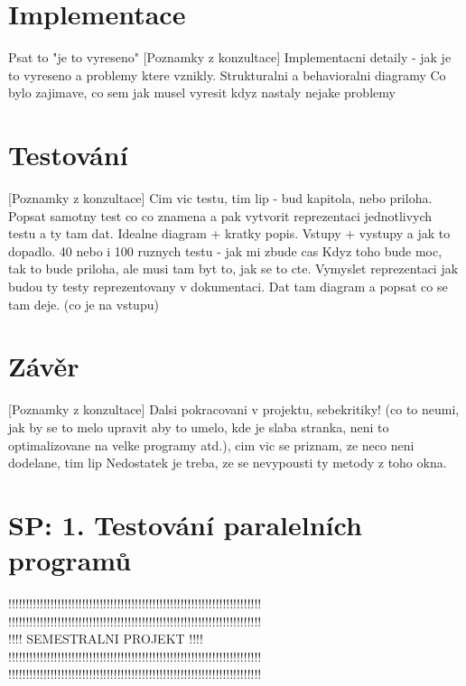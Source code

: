 \chapter{Implementace}

Psat to "je to vyreseno"
[Poznamky z konzultace] Implementacni detaily - jak je to vyreseno a problemy ktere vznikly. Strukturalni a behavioralni diagramy
Co bylo zajimave, co sem jak musel vyresit kdyz nastaly nejake problemy

\chapter{Testování}

[Poznamky z konzultace] Cim vic testu, tim lip - bud kapitola, nebo priloha. Popsat samotny test co co znamena a pak vytvorit reprezentaci jednotlivych testu a ty tam dat. Idealne diagram + kratky popis. Vstupy + vystupy a jak to dopadlo.
40 nebo i 100 ruznych testu - jak mi zbude cas
Kdyz toho bude moc, tak to bude priloha, ale musi tam byt to, jak se to cte. Vymyslet reprezentaci jak budou ty testy reprezentovany v dokumentaci. Dat tam diagram a popsat co se tam deje. (co je na vstupu)

\chapter{Závěr}

[Poznamky z konzultace] Dalsi pokracovani v projektu, sebekritiky! (co to neumi, jak by se to melo upravit aby to umelo, kde je slaba stranka, neni to optimalizovane na velke programy atd.), cim vic se priznam, ze neco neni dodelane, tim lip
Nedostatek je treba, ze se nevypousti ty metody z toho okna.

\chapter{SP: 1. Testování paralelních programů}

!!!!!!!!!!!!!!!!!!!!!!!!!!!!!!!!!!!!!!!!!!!!!!!!!!!!!!!!!!!!!!!!!!!!!!!!\\
!!!!!!!!!!!!!!!!!!!!!!!!!!!!!!!!!!!!!!!!!!!!!!!!!!!!!!!!!!!!!!!!!!!!!!!!\\
!!!! SEMESTRALNI PROJEKT !!!!\\
!!!!!!!!!!!!!!!!!!!!!!!!!!!!!!!!!!!!!!!!!!!!!!!!!!!!!!!!!!!!!!!!!!!!!!!!\\
!!!!!!!!!!!!!!!!!!!!!!!!!!!!!!!!!!!!!!!!!!!!!!!!!!!!!!!!!!!!!!!!!!!!!!!!\\

